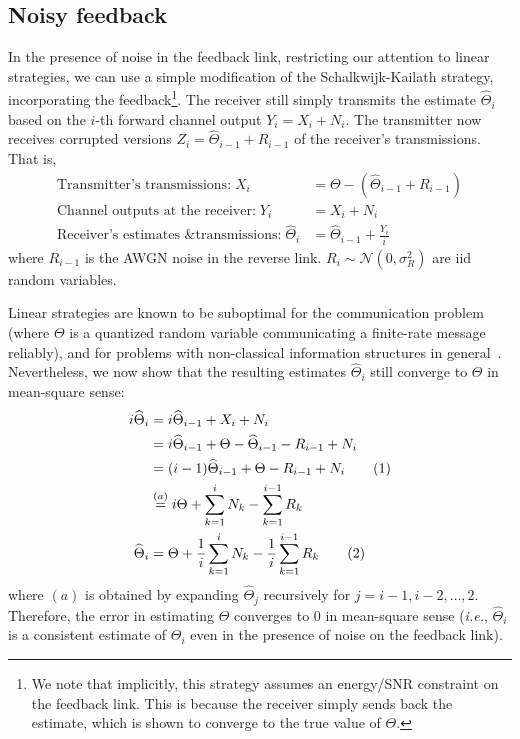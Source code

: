 \documentclass[conference]{IEEEtran}
\newcommand\numberthis{\stepcounter{equation}\tag{\theequation}}
\begin{document}
\subsection{Noisy feedback}
In the presence of noise in the feedback link, restricting our attention to linear strategies, we can use a simple modification of the Schalkwijk-Kailath strategy, incorporating the feedback\footnote{We note that implicitly, this strategy assumes an energy/SNR constraint on the feedback link. This is because the receiver simply sends back the estimate, which is shown to converge to the true value of $\Theta$.}. The receiver still simply transmits the estimate $\widehat{\Theta}_i$ based on the $i$-th forward channel output $Y_i=X_i+N_i$. The transmitter now receives corrupted versions $Z_i=\widehat\Theta_{i-1} + R_{i-1}$ of the receiver's transmissions. That is,
\begin{align*}
	\text{Transmitter's transmissions:}\;X_i &= \Theta - (\widehat\Theta_{i-1} + R_{i-1}) \\
	\text{Channel outputs at the receiver:}\;	Y_i &= X_i + N_i \\
	\text{Receiver's estimates \& transmissions:}\;	\widehat\Theta_i &= \widehat\Theta_{i-1} + \frac{Y_i}{i}
\end{align*}
where $R_{i-1}$ is the AWGN noise in the reverse link. $R_i \sim \mathcal{N}(0, \sigma_R^2)$ are iid random variables.

Linear strategies are known to be suboptimal for the communication problem~\cite{YoungHanKimPaper} (where $\Theta$ is a quantized random variable communicating a finite-rate message reliably), and for problems with non-classical information structures in general~\cite{Witsenhausen68}. Nevertheless, we now show that the resulting estimates $\widehat{\Theta}_i$  still converge to $\Theta$ in mean-square sense:
\begin{align*}
	i\widehat\Theta_i &= i\widehat\Theta_{i-1} + X_i + N_i \\
					  &= i\widehat\Theta_{i-1} + \Theta - \widehat\Theta_{i-1} - R_{i-1} + N_i \\
					  &= (i-1) \widehat\Theta_{i-1} + \Theta - R_{i-1} + N_i \numberthis \label{eq:theta_hat_i-noisy-once} \\
					  &\overset{(a)}{=} i\Theta + \sum_{k=1}^i N_k - \sum_{k=1}^{i-1} R_k \\
	\widehat\Theta_i  &= \Theta + \frac{1}{i} \sum_{k=1}^i N_k - \frac{1}{i} \sum_{k=1}^{i-1} R_k \numberthis \label{eq:theta_hat_i-noisy}
\end{align*}
where $(a)$ is obtained by expanding $\widehat{\Theta}_j$ recursively for $j=i-1,i-2,\ldots,2$. Therefore, the error in estimating $\Theta$ converges to $0$ in mean-square sense (\textit{i.e.}, $\widehat{\Theta}_i$ is a consistent estimate of $\Theta_i$ even in the presence of noise on the feedback link).
\end{document}
